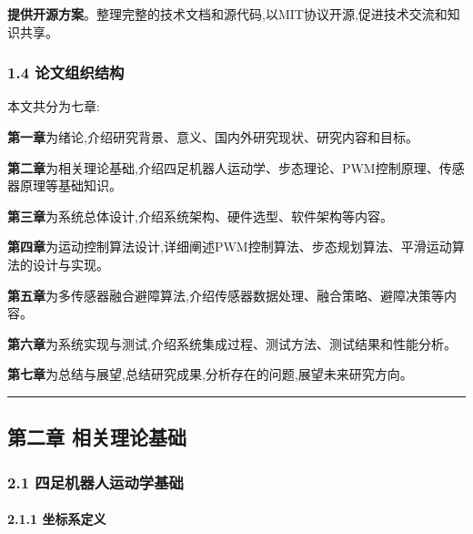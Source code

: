 \documentclass[
]{article}
\begin{document}
\textbf{提供开源方案}。整理完整的技术文档和源代码,以MIT协议开源,促进技术交流和知识共享。

\hypertarget{ux8bbaux6587ux7ec4ux7ec7ux7ed3ux6784}{%
\subsubsection{1.4
论文组织结构}\label{ux8bbaux6587ux7ec4ux7ec7ux7ed3ux6784}}

本文共分为七章:

\textbf{第一章}为绪论,介绍研究背景、意义、国内外研究现状、研究内容和目标。

\textbf{第二章}为相关理论基础,介绍四足机器人运动学、步态理论、PWM控制原理、传感器原理等基础知识。

\textbf{第三章}为系统总体设计,介绍系统架构、硬件选型、软件架构等内容。

\textbf{第四章}为运动控制算法设计,详细阐述PWM控制算法、步态规划算法、平滑运动算法的设计与实现。

\textbf{第五章}为多传感器融合避障算法,介绍传感器数据处理、融合策略、避障决策等内容。

\textbf{第六章}为系统实现与测试,介绍系统集成过程、测试方法、测试结果和性能分析。

\textbf{第七章}为总结与展望,总结研究成果,分析存在的问题,展望未来研究方向。

\begin{center}\rule{0.5\linewidth}{0.5pt}\end{center}

\hypertarget{ux7b2cux4e8cux7ae0-ux76f8ux5173ux7406ux8bbaux57faux7840}{%
\subsection{第二章
相关理论基础}\label{ux7b2cux4e8cux7ae0-ux76f8ux5173ux7406ux8bbaux57faux7840}}

\hypertarget{ux56dbux8db3ux673aux5668ux4ebaux8fd0ux52a8ux5b66ux57faux7840}{%
\subsubsection{2.1
四足机器人运动学基础}\label{ux56dbux8db3ux673aux5668ux4ebaux8fd0ux52a8ux5b66ux57faux7840}}

\hypertarget{ux5750ux6807ux7cfbux5b9aux4e49}{%
\paragraph{2.1.1 坐标系定义}\label{ux5750ux6807ux7cfbux5b9aux4e49}}
\end{document}
